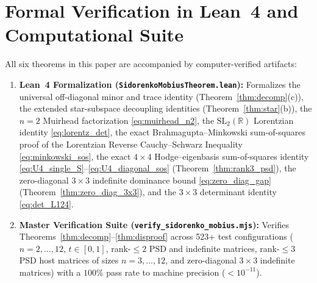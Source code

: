 \documentclass[11pt,a4paper]{article}
\theoremstyle{plain}
\theoremstyle{definition}
\theoremstyle{remark}
\begin{document}
\section{Formal Verification in Lean~4 and Computational Suite}

All six theorems in this paper are accompanied by computer-verified artifacts:
\begin{enumerate}[label=(\arabic*),nosep]
  \item \textbf{Lean~4 Formalization (\texttt{SidorenkoMobiusTheorem.lean}):} Formalizes the universal off-diagonal minor and trace identity (Theorem~\ref{thm:decomp}(c)), the extended star-subspace decoupling identities (Theorem~\ref{thm:star}(b)), the $n = 2$ Muirhead factorization \eqref{eq:muirhead_n2}, the $\mathrm{SL}_2(\mathbb{R})$ Lorentzian identity \eqref{eq:lorentz_det}, the exact Brahmagupta--Minkowski sum-of-squares proof of the Lorentzian Reverse Cauchy--Schwarz Inequality \eqref{eq:minkowski_sos}, the exact $4 \times 4$ Hodge--eigenbasis sum-of-squares identity \eqref{eq:U4_single_S}--\eqref{eq:U4_diagonal_sos} (Theorem~\ref{thm:rank3_psd}), the zero-diagonal $3 \times 3$ indefinite dominance bound \eqref{eq:zero_diag_gap} (Theorem~\ref{thm:zero_diag_3x3}), and the $3 \times 3$ determinant identity \eqref{eq:det_L124}.
  \item \textbf{Master Verification Suite (\texttt{verify\_sidorenko\_mobius.mjs}):} Verifies Theorems~\ref{thm:decomp}--\ref{thm:disproof} across 523+ test configurations ($n = 2,\dots,12$, $t \in [0,1]$, rank-$\le 2$ PSD and indefinite matrices, rank-$\le 3$ PSD host matrices of sizes $n = 3,\dots,12$, and zero-diagonal $3 \times 3$ indefinite matrices) with a $100\%$ pass rate to machine precision ($< 10^{-11}$).
\end{enumerate}
\end{document}
